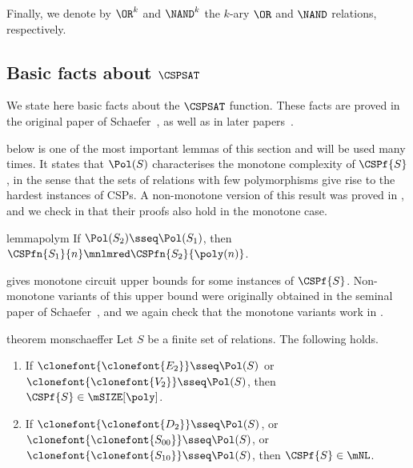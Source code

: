 \documentclass[11pt]{article}
\begin{document}
Finally, we denote by $\OR^k$ and $\NAND^k$
the $k$-ary $\OR$ and $\NAND$ relations, respectively.


\subsection{Basic facts about $\CSPSAT$}
\label{sec:csp-fact}



We state 
here basic facts about the $\CSPSAT$ function.
These facts are proved in the original paper of
Schaefer~\cite{DBLP:conf/stoc/Schaefer78},
as well as in later
papers~\cite{DBLP:journals/tcs/Jeavons98,
playing_one,playing_two,DBLP:journals/jcss/AllenderBISV09}.

 below is one of the most important lemmas of this section and
will be used many times. It states that $\Pol(S)$
characterises the monotone complexity of $\CSPf{S}$, in the sense that 
the sets of relations with few polymorphisms give rise to the hardest
instances of CSPs.
A non-monotone version of this result was proved in
\cite[Theorem 2.4]{DBLP:journals/tcs/Jeavons98, playing_two},
and we
check 
in 
that their proofs also hold in the monotone
case.





 

\begin{restatable}
    {lemma}{polym}
    \label{prop:poly}
    If $\Pol(S_2) \sseq \Pol(S_1)$,
    then
    $\CSPfn{S_1}{n} \mnlmred \CSPfn{S_2}{\poly(n)}$.
\end{restatable}




 gives monotone circuit upper bounds
for some instances of $\CSPf{S}$.
Non-monotone variants of this upper bound were originally obtained
in the seminal paper of Schaefer~\cite{DBLP:conf/stoc/Schaefer78},
and we again check that the monotone variants work in
.

\begin{restatable}
{theorem}
{monschaeffer}
    \label{thm:mon-schaefer}
    Let $S$ be a finite set of relations.
    The following holds.
    \begin{enumerate}
        \item
            If $\clonefont{\clonefont{E_2}} \sseq \Pol(S)$ or $\clonefont{\clonefont{V_2}} \sseq \Pol(S)$,
            then
            $\CSPf{S} \in \mSIZE[\poly]$.
        \item 
            If 
            $\clonefont{\clonefont{D_2}} \sseq \Pol(S)$,
            or
            $\clonefont{\clonefont{S_{00}}} \sseq \Pol(S)$,
            or
            $\clonefont{\clonefont{S_{10}}} \sseq \Pol(S)$,
            then
            $\CSPf{S} \in \mNL$.
    \end{enumerate}
\end{restatable}
\end{document}
